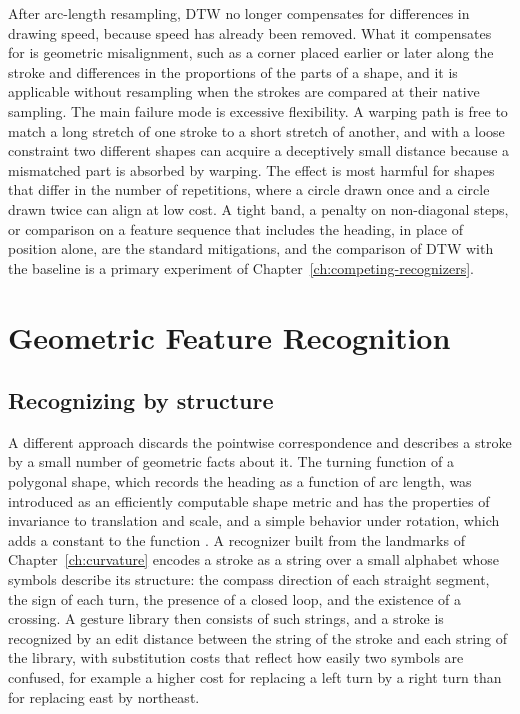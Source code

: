 After arc-length resampling, DTW no longer compensates for differences in drawing speed, because speed has already been removed. What it compensates for is geometric misalignment, such as a corner placed earlier or later along the stroke and differences in the proportions of the parts of a shape, and it is applicable without resampling when the strokes are compared at their native sampling. The main failure mode is excessive flexibility. A warping path is free to match a long stretch of one stroke to a short stretch of another, and with a loose constraint two different shapes can acquire a deceptively small distance because a mismatched part is absorbed by warping. The effect is most harmful for shapes that differ in the number of repetitions, where a circle drawn once and a circle drawn twice can align at low cost. A tight band, a penalty on non-diagonal steps, or comparison on a feature sequence that includes the heading, in place of position alone, are the standard mitigations, and the comparison of DTW with the baseline is a primary experiment of Chapter~\ref{ch:competing-recognizers}.\evH

\chapter{Geometric Feature Recognition}\label{ch:geometric-recognition}

\section{Recognizing by structure}

A different approach discards the pointwise correspondence and describes a stroke by a small number of geometric facts about it. The turning function of a polygonal shape, which records the heading as a function of arc length, was introduced as an efficiently computable shape metric and has the properties of invariance to translation and scale, and a simple behavior under rotation, which adds a constant to the function \cite{arkin1991}.\evD{} A recognizer built from the landmarks of Chapter~\ref{ch:curvature} encodes a stroke as a string over a small alphabet whose symbols describe its structure: the compass direction of each straight segment, the sign of each turn, the presence of a closed loop, and the existence of a crossing. A gesture library then consists of such strings, and a stroke is recognized by an edit distance between the string of the stroke and each string of the library, with substitution costs that reflect how easily two symbols are confused, for example a higher cost for replacing a left turn by a right turn than for replacing east by northeast.

